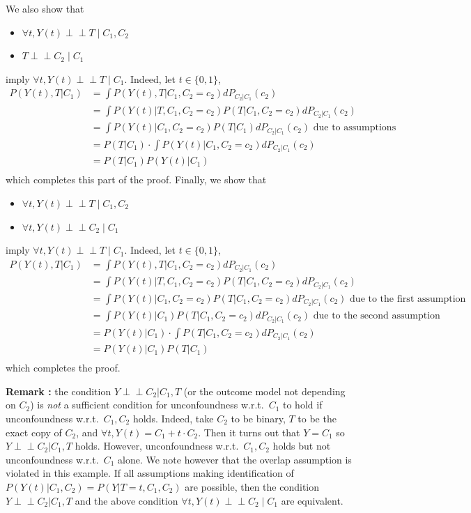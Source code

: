 \documentclass{article}
\theoremstyle{plain}
\theoremstyle{definition}
\theoremstyle{remark}
\theoremstyle{mystyle}
\newcommand{\indep}{\perp\!\!\!\!\perp}
\begin{document}
 
 
 \iffalse
 We also show that
 \begin{itemize}
     \item $\forall t, Y(t) \indep T \mid C_1, C_2$
     \item $T \indep C_2 \mid C_1$
 \end{itemize}
 imply $\forall t, Y(t) \indep T \mid C_1$. Indeed, let $t \in \{0,1\}$,
 \begin{align*}
     P(Y(t), T | C_1)
     &= \int P(Y(t), T | C_1, C_2 = c_2)dP_{C_2 | C_1}(c_2) \\
     &= \int P(Y(t) | T, C_1, C_2 = c_2)P(T | C_1, C_2 = c_2)dP_{C_2 | C_1}(c_2) \\
     &= \int P(Y(t) | C_1, C_2 = c_2)P(T | C_1)dP_{C_2 | C_1}(c_2) \text{ due to assumptions} \\ 
      &= P(T | C_1) \cdot \int P(Y(t) | C_1, C_2 = c_2)dP_{C_2 | C_1}(c_2)  \\ 
        &= P(T | C_1) P(Y(t) | C_1)  \\ 
 \end{align*}
 which completes this part of the proof. Finally, we show that
 \begin{itemize}
     \item $\forall t, Y(t) \indep T \mid C_1, C_2$
     \item $\forall t, Y(t) \indep C_2 \mid C_1$
 \end{itemize}
 imply $\forall t, Y(t) \indep T \mid C_1$. Indeed, let $t \in \{0,1\}$,
 \begin{align*}
     P(Y(t), T | C_1)
     &= \int P(Y(t), T | C_1, C_2 = c_2)dP_{C_2 | C_1}(c_2) \\
     &= \int P(Y(t) | T, C_1, C_2 = c_2)P(T | C_1, C_2 = c_2)dP_{C_2 | C_1}(c_2) \\
     &= \int P(Y(t) | C_1, C_2 = c_2)P(T | C_1, C_2 = c_2)dP_{C_2 | C_1}(c_2) \text{ due to the first assumption} \\ 
      &= \int P(Y(t) | C_1)P(T | C_1, C_2 = c_2)dP_{C_2 | C_1}(c_2) \text{ due to the second assumption} \\ 
      &= P(Y(t) | C_1) \cdot \int P(T | C_1, C_2 = c_2)dP_{C_2 | C_1}(c_2)  \\ 
        &= P(Y(t) | C_1)P(T | C_1)   \\ 
 \end{align*}
 which completes the proof.
 
 
\textbf{Remark :} the condition $Y \indep C_2 | C_1, T$ (or the outcome model not depending on $C_2$) is \emph{not} a sufficient condition for unconfoundness w.r.t.~$C_1$ to hold if unconfoundness w.r.t.~$C_1, C_2$ holds. Indeed, take $C_2$ to be binary, $T$ to be the exact copy of $C_2$, and $\forall t, Y(t) = C_1 + t \cdot C_2$. Then it turns out that $Y = C_1$ so $Y \indep C_2 | C_1, T$ holds. However, unconfoundness w.r.t.~$C_1, C_2$ holds but not unconfoundness w.r.t.~$C_1$ alone. We note however that the overlap assumption is violated in this example. If all assumptions making identification of $P(Y(t) | C_1, C_2) = P(Y | T=t, C_1, C_2)$ are possible, then the condition $Y \indep C_2 | C_1, T$ and the above condition $\forall t, Y(t) \indep C_2 \mid C_1$ are equivalent.
\end{document}
